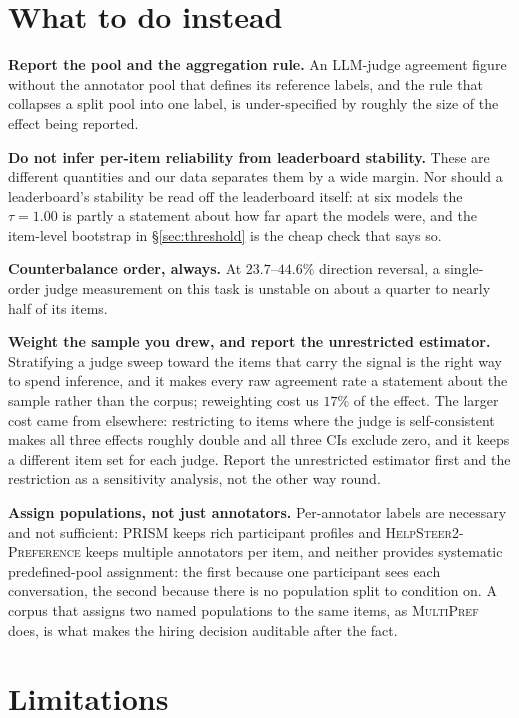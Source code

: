 \documentclass{article}
\begin{document}
\section{What to do instead}

\textbf{Report the pool and the aggregation rule.} An LLM-judge agreement figure without
the annotator pool that defines its reference labels, and the rule that collapses a split
pool into one label, is under-specified by roughly the size of the effect being reported.

\textbf{Do not infer per-item reliability from leaderboard stability.} These are
different quantities and our data separates them by a wide margin. Nor should a
leaderboard's stability be read off the leaderboard itself: at six models the $\tau=1.00$
is partly a statement about how far apart the models were, and the item-level bootstrap in
\S\ref{sec:threshold} is the cheap check that says so.

\textbf{Counterbalance order, always.} At $23.7$--$44.6\%$ direction reversal, a
single-order judge measurement on this task is unstable on about a quarter to nearly half
of its items.

\textbf{Weight the sample you drew, and report the unrestricted estimator.} Stratifying a
judge sweep toward the items that carry the signal is the right way to spend inference, and
it makes every raw agreement rate a statement about the sample rather than the corpus;
reweighting cost us $17\%$ of the effect. The larger cost came from elsewhere: restricting
to items where the judge is self-consistent makes all three effects roughly double and all
three CIs exclude zero, and it keeps a different item set for each judge. Report the
unrestricted estimator first and the restriction as a sensitivity analysis, not the other
way round.

\textbf{Assign populations, not just annotators.} Per-annotator labels are necessary and
not sufficient: \textsc{PRISM} keeps rich participant profiles and
\textsc{HelpSteer2-Preference} keeps multiple annotators per item, and neither provides
systematic predefined-pool assignment: the first because one participant sees each conversation, the second
because there is no population split to condition on. A corpus that assigns two named
populations to the same items, as \textsc{MultiPref} does, is what makes the hiring
decision auditable after the fact.

\section{Limitations}\label{sec:limits}
\end{document}
